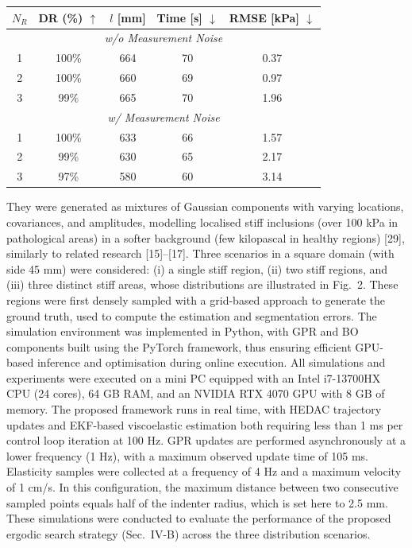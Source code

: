 \documentclass[11pt]{article}
\begin{document}
\begin{center}
\footnotesize
\begin{tabular}{|c|c|c|c|c|}
\hline
$N_{R}$ & DR (\%) $\uparrow$ & $l$ [mm] & Time [s] $\downarrow$ &
RMSE [kPa] $\downarrow$ \\
\hline
\multicolumn{5}{|c|}{\textit{w/o Measurement Noise}} \\
\hline
1 & 100\% & 664 & 70 & 0.37 \\
2 & 100\% & 660 & 69 & 0.97 \\
3 & 99\%  & 665 & 70 & 1.96 \\
\hline
\multicolumn{5}{|c|}{\textit{w/ Measurement Noise}} \\
\hline
1 & 100\% & 633 & 66 & 1.57 \\
2 & 99\%  & 630 & 65 & 2.17 \\
3 & 97\%  & 580 & 60 & 3.14 \\
\hline
\end{tabular}
\end{center}

\vspace{0.8em}

They were generated as mixtures of Gaussian components with varying
locations, covariances, and amplitudes, modelling localised stiff
inclusions (over 100 kPa in pathological areas) in a softer
background (few kilopascal in healthy regions) [29], similarly to
related research [15]--[17]. Three scenarios in a square domain
(with side 45 mm) were considered: (i) a single stiff region,
(ii) two stiff regions, and (iii) three distinct stiff areas, whose
distributions are illustrated in Fig.~2. These regions were first
densely sampled with a grid-based approach to generate the ground
truth, used to compute the estimation and segmentation errors. The
simulation environment was implemented in Python, with GPR and BO
components built using the PyTorch framework, thus ensuring
efficient GPU-based inference and optimisation during online
execution. All simulations and experiments were executed on a mini
PC equipped with an Intel i7-13700HX CPU (24 cores), 64 GB RAM, and
an NVIDIA RTX 4070 GPU with 8 GB of memory. The proposed framework
runs in real time, with HEDAC trajectory updates and EKF-based
viscoelastic estimation both requiring less than 1 ms per control
loop iteration at 100 Hz. GPR updates are performed asynchronously
at a lower frequency (1 Hz), with a maximum observed update time of
105 ms. Elasticity samples were collected at a frequency of 4 Hz and
a maximum velocity of 1 cm/s. In this configuration, the maximum
distance between two consecutive sampled points equals half of the
indenter radius, which is set here to 2.5 mm. These simulations were
conducted to evaluate the performance of the proposed ergodic search
strategy (Sec.~IV-B) across the three distribution scenarios.
\end{document}
